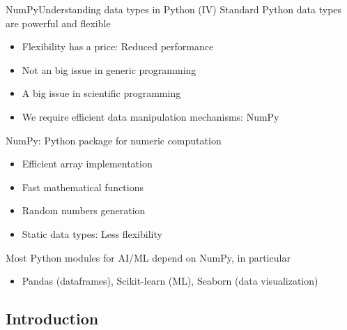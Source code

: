 \documentclass[10pt,compress]{beamer} %
\begin{document}
\begin{frame}[fragile]{NumPy}{Understanding data types in Python (IV)}
	Standard Python data types are powerful and flexible
	\begin{itemize}
		\item Flexibility has a price: Reduced performance
		\item Not an big issue in generic programming
		\item A big issue in scientific programming
		\item We require efficient data manipulation mechanisms: NumPy
	\end{itemize}
	NumPy: Python package for numeric computation
	\begin{itemize}
		\item Efficient array implementation
		\item Fast mathematical functions
		\item Random numbers generation
		\item Static data types: Less flexibility
	\end{itemize}
	Most Python modules for AI/ML depend on NumPy, in particular
	\begin{itemize}
		\item Pandas (dataframes), Scikit-learn (ML), Seaborn (data visualization)
	\end{itemize}
\end{frame}

\subsection{Introduction}
\end{document}
